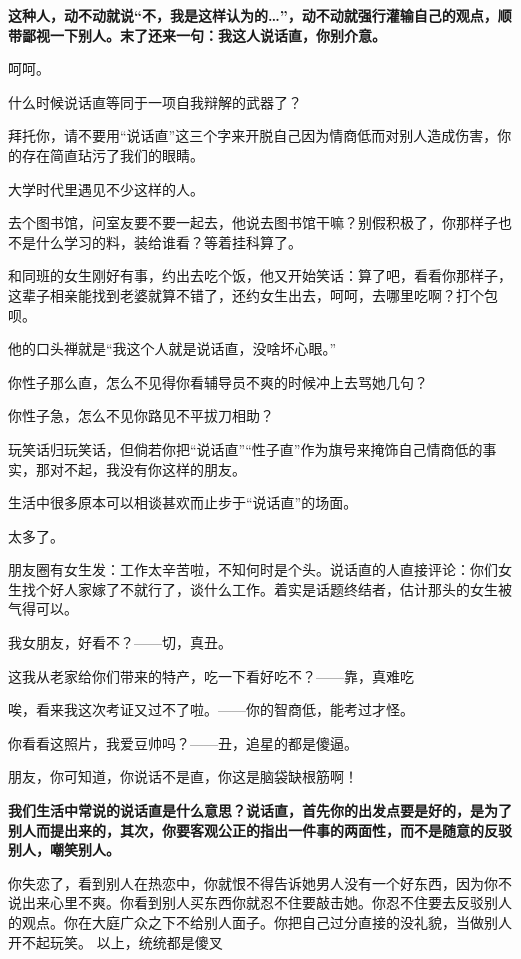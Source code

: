 \documentclass[UTF8,a4paper,8pt]{ctexart}
\begin{document}
 \textbf{这种人，动不动就说“不，我是这样认为的…”，动不动就强行灌输自己的观点，顺带鄙视一下别人。末了还来一句：我这人说话直，你别介意。}
 
 呵呵。
 
 什么时候说话直等同于一项自我辩解的武器了？
 
 拜托你，请不要用“说话直”这三个字来开脱自己因为情商低而对别人造成伤害，你的存在简直玷污了我们的眼睛。
 
 
 大学时代里遇见不少这样的人。
 
 去个图书馆，问室友要不要一起去，他说去图书馆干嘛？别假积极了，你那样子也不是什么学习的料，装给谁看？等着挂科算了。
 
 和同班的女生刚好有事，约出去吃个饭，他又开始笑话：算了吧，看看你那样子，这辈子相亲能找到老婆就算不错了，还约女生出去，呵呵，去哪里吃啊？打个包呗。
 
 他的口头禅就是“我这个人就是说话直，没啥坏心眼。”
 
 你性子那么直，怎么不见得你看辅导员不爽的时候冲上去骂她几句？
 
 你性子急，怎么不见你路见不平拔刀相助？
 
 玩笑话归玩笑话，但倘若你把“说话直”“性子直”作为旗号来掩饰自己情商低的事实，那对不起，我没有你这样的朋友。
 
 
 
 生活中很多原本可以相谈甚欢而止步于“说话直”的场面。
 
 太多了。
 
 朋友圈有女生发：工作太辛苦啦，不知何时是个头。说话直的人直接评论：你们女生找个好人家嫁了不就行了，谈什么工作。着实是话题终结者，估计那头的女生被气得可以。
 
 我女朋友，好看不？——切，真丑。
 
 这我从老家给你们带来的特产，吃一下看好吃不？——靠，真难吃
 
 唉，看来我这次考证又过不了啦。——你的智商低，能考过才怪。
 
 你看看这照片，我爱豆帅吗？——丑，追星的都是傻逼。
 
 朋友，你可知道，你说话不是直，你这是脑袋缺根筋啊！
 
 \textbf{我们生活中常说的说话直是什么意思？说话直，首先你的出发点要是好的，是为了别人而提出来的，其次，你要客观公正的指出一件事的两面性，而不是随意的反驳别人，嘲笑别人。}
 
 你失恋了，看到别人在热恋中，你就恨不得告诉她男人没有一个好东西，因为你不说出来心里不爽。你看到别人买东西你就忍不住要敲击她。你忍不住要去反驳别人的观点。你在大庭广众之下不给别人面子。你把自己过分直接的没礼貌，当做别人开不起玩笑。
 以上，统统都是傻叉
 
\end{document}
